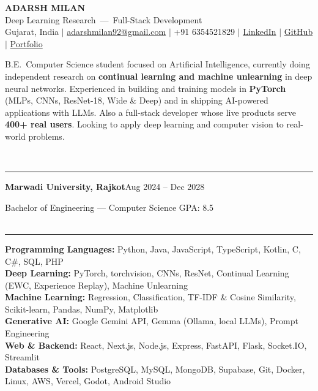 \documentclass[10pt,a4paper]{article}
\renewcommand{\section}[1]{\vspace{6pt}{\large\bfseries\MakeUppercase{#1}}\\[-7pt]\rule{\textwidth}{0.6pt}\vspace{2pt}}
\newcommand{\entry}[2]{\par\textbf{#1}\hfill #2\par}
\newcommand{\sep}{\enspace$|$\enspace}
\begin{document}
\begin{center}
  {\Huge\bfseries ADARSH MILAN}\\[3pt]
  {\large Deep Learning Research \,---\, Full-Stack Development}\\[3pt]
  Gujarat, India \sep
  \href{mailto:adarshmilan92@gmail.com}{adarshmilan92@gmail.com} \sep
  +91 6354521829 \sep
  \href{https://www.linkedin.com/in/adarsh-milan-383527304}{LinkedIn} \sep
  \href{https://github.com/Adarshmilan}{GitHub} \sep
  \href{https://portfoliyo-zeta-indol.vercel.app/}{Portfolio}
\end{center}

B.E.\ Computer Science student focused on Artificial Intelligence, currently doing independent research on
\textbf{continual learning and machine unlearning} in deep neural networks. Experienced in building and training
models in \textbf{PyTorch} (MLPs, CNNs, ResNet-18, Wide \& Deep) and in shipping AI-powered applications with LLMs.
Also a full-stack developer whose live products serve \textbf{400+ real users}. Looking to apply deep learning
and computer vision to real-world problems.

\section{Education}
\entry{Marwadi University, Rajkot}{Aug 2024 -- Dec 2028}
Bachelor of Engineering --- Computer Science \hfill GPA: 8.5\\

\section{Skills}
\textbf{Programming Languages:} Python, Java, JavaScript, TypeScript, Kotlin, C, C\#, SQL, PHP\\
\textbf{Deep Learning:} PyTorch, torchvision, CNNs, ResNet, Continual Learning (EWC, Experience Replay), Machine Unlearning\\
\textbf{Machine Learning:} Regression, Classification, TF-IDF \& Cosine Similarity, Scikit-learn, Pandas, NumPy, Matplotlib\\
\textbf{Generative AI:} Google Gemini API, Gemma (Ollama, local LLMs), Prompt Engineering\\
\textbf{Web \& Backend:} React, Next.js, Node.js, Express, FastAPI, Flask, Socket.IO, Streamlit\\
\textbf{Databases \& Tools:} PostgreSQL, MySQL, MongoDB, Supabase, Git, Docker, Linux, AWS, Vercel, Godot, Android Studio\\
\end{document}

